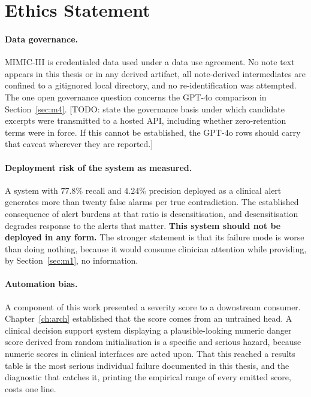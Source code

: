 \section{Ethics Statement}
\label{sec:eval-ethics}

\paragraph{Data governance.} MIMIC-III is credentialed data used under a data
use agreement. No note text appears in this thesis or in any derived artifact,
all note-derived intermediates are confined to a gitignored local directory, and
no re-identification was attempted. The one open governance question concerns
the GPT-4o comparison in Section~\ref{sec:m4}. [TODO: state the governance basis
under which candidate excerpts were transmitted to a hosted API, including
whether zero-retention terms were in force. If this cannot be established, the
GPT-4o rows should carry that caveat wherever they are reported.]

\paragraph{Deployment risk of the system as measured.} A system with $77.8\%$
recall and $4.24\%$ precision deployed as a clinical alert generates more than
twenty false alarms per true contradiction. The established consequence of alert
burdens at that ratio is desensitisation, and desensitisation degrades response
to the alerts that matter. \textbf{This system should not be deployed in any
form.} The stronger statement is that its failure mode is worse than doing
nothing, because it would consume clinician attention while providing, by
Section~\ref{sec:m1}, no information.

\paragraph{Automation bias.} A component of this work presented a severity score
to a downstream consumer. Chapter~\ref{ch:arch} established that the score comes
from an untrained head. A clinical decision support system displaying a
plausible-looking numeric danger score derived from random initialisation is a
specific and serious hazard, because numeric scores in clinical interfaces are
acted upon. That this reached a results table is the most serious individual
failure documented in this thesis, and the diagnostic that catches it, printing
the empirical range of every emitted score, costs one line.

